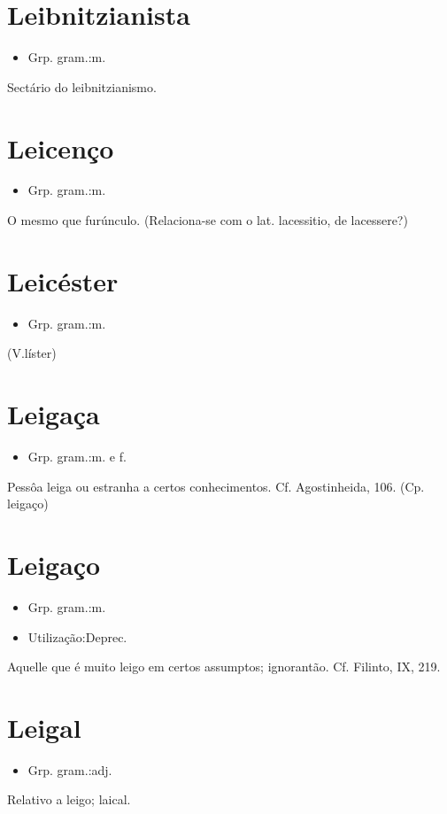 \section{Leibnitzianista}
\begin{itemize}
\item {Grp. gram.:m.}
\end{itemize}
Sectário do leibnitzianismo.
\section{Leicenço}
\begin{itemize}
\item {Grp. gram.:m.}
\end{itemize}
O mesmo que \textunderscore furúnculo\textunderscore .
(Relaciona-se com o lat. \textunderscore lacessitio\textunderscore , de \textunderscore lacessere\textunderscore ?)
\section{Leicéster}
\begin{itemize}
\item {Grp. gram.:m.}
\end{itemize}
(V.líster)
\section{Leigaça}
\begin{itemize}
\item {Grp. gram.:m.  e  f.}
\end{itemize}
Pessôa leiga ou estranha a certos conhecimentos. Cf. \textunderscore Agostinheida\textunderscore , 106.
(Cp. \textunderscore leigaço\textunderscore )
\section{Leigaço}
\begin{itemize}
\item {Grp. gram.:m.}
\end{itemize}
\begin{itemize}
\item {Utilização:Deprec.}
\end{itemize}
Aquelle que é muito leigo em certos assumptos; ignorantão. Cf. Filinto, IX, 219.
\section{Leigal}
\begin{itemize}
\item {Grp. gram.:adj.}
\end{itemize}
Relativo a leigo; laical.
